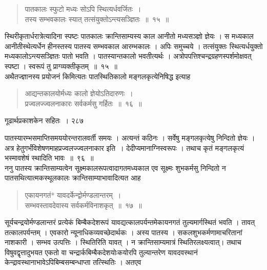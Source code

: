 \documentclass[11pt, openany]{book}
\begin{document}
\begin{quote}
{\ssi पातकालः स्फुटो मध्यः सोऽपि स्थित्यर्धवर्जितः~।\\ 
तस्य सम्भवकालः स्यात् तत्संयुक्तोऽन्त्यसञ्ज्ञितः~॥~१५~॥} 
\end{quote}

 स्थिरीकृतार्धरात्रेत्यादिना स्पष्टः पातकालः क्रान्तिसाम्यस्य काल आनीतो मध्यसञ्ज्ञो ज्ञेयः । स मध्यकाल आनीतीस्थेत्यर्धेन हीनस्तस्य पातस्य सम्भवकाल आरम्भकालः । अपिः समुच्चये । तत्संयुक्तः स्थित्यर्धयुक्तो मध्यकालोऽन्त्यसञ्ज्ञितः पातो भवति । पातस्यान्तकालो भवतीत्यर्थः । अत्रोपपत्तिश्चन्द्रग्रहणस्पर्शमोक्षवत् स्पष्टा । स्वरूपं तु प्राग्व्यक्तीकृतम्~॥~१५~॥\\
 \noindent अथैतज्ज्ञानस्य प्रयोजनं किमित्यतः पातस्थितिकालो मङ्गलकृत्येनिषिद्ध इत्याह\textendash 
 

\begin{quote}
{\ssi आद्यन्तकालयोर्मध्यः कालो ज्ञेयोऽतिदारुणः~।\\
प्रज्वलज्ज्वलनाकारः सर्वकर्मसु गर्हितः~॥~१६~॥}
%
\end{quote}
\newpage

\hspace{3cm} गूढार्थप्रकाशकेन सहितः~। \hfill २८७
\vspace{1cm}


 पातस्यारम्भसमाप्तिसमययोरन्तरालवर्ती समयः । अत्यन्तं कठिनः । सर्वेषु मङ्गलकृत्येषु निन्दितो ज्ञेयः । अत्र हेतुगर्भंविशेषणमाह\textendash प्रज्वलज्ज्वलनाकार इति~। देदीप्यमानाग्निस्वरूपः । तथाच कृतं मङ्गलकृत्यं भस्मावशेषं स्थादिति भावः~॥~९६~॥\\
\noindent ननु पातस्य क्रान्तिसाम्यत्वेन सूक्ष्मकालरूपत्वादागतमध्यकाल एव सूक्ष्मः शुभकर्मसु निन्दितो न पातसथित्यात्मकस्थूलकालः क्रान्तिसाम्याभावादित्यत आह \textendash

\begin{quote}
{\ssi एकायनगतं* यावदर्केन्द्वोर्मण्डलान्तरम्~।\\
 सम्भवस्तावदेवास्य सर्वकर्मविनाशकृत्~॥~१७~॥ }
\end{quote}
 सूर्यचन्द्रयोर्मण्डलान्तरं प्रत्येकं बिम्बैकदेशरूपं यावद्यत्कालपर्यन्तमेकायनगतं तुल्यमार्गस्थितं भवति । तावत् तत्कालपर्यन्तम् । एवकारो न्यूनाधिकव्यवच्छेदार्थकः । अस्य पातस्य । सकलशुभकर्मणामाचरितानां नाशकारी । सम्भव उत्पत्तिः । स्थितिरिति यावत् । न क्रान्तिसाम्यमात्रं स्थितिरलक्ष्यत्वात्। तथाच विषुवद्वृत्तादुभयत एकतो वा चन्द्रार्कबिम्बैकदेशयोःकयोरपि तुल्यान्तरेण यावदवस्थानं केन्द्रावस्थानाभावेऽपिबिम्बसम्बन्धाप्ता तत्स्थितिः । अतएव\textendash
\end{document}
